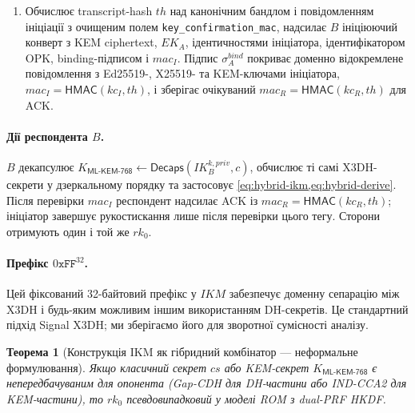 \documentclass[11pt,a4paper]{article}
\newtheorem{theorem}{Теорема}[section]
\theoremstyle{definition}
\newcommand{\HKDF}{\textsf{HKDF}}
\newcommand{\HMAC}{\textsf{HMAC}}
\newcommand{\KEM}{\textsf{ML-KEM-768}}
\newcommand{\Decaps}{\textsf{Decaps}}
\newcommand{\GapCDH}{\textsf{Gap-CDH}}
\newcommand{\INDCCA}{\textsf{IND-CCA2}}
\newcommand{\dualPRF}{\textsf{dual-PRF}}
\newcommand{\rk}{\ensuremath{\mathit{rk}}}
\newcommand{\mdk}{\ensuremath{\mathit{mdk}}}
\newcommand{\IK}{\ensuremath{\mathit{IK}}}
\newcommand{\EK}{\ensuremath{\mathit{EK}}}
\begin{document}
\begin{enumerate}
\begin{align}
      \mdk_0 &\gets \HKDF(\rk_0,\,32,\,\mathit{ctx}_{md},\,
        \texttt{Aura-MetadataKey}),\\
      \mathit{kc}_I &\gets \HKDF(\rk_0,\,32,\,\varepsilon,\,
        \texttt{Aura-KeyConfirm-I}),\\
      \mathit{kc}_R &\gets \HKDF(\rk_0,\,32,\,\varepsilon,\,
        \texttt{Aura-KeyConfirm-R}).
    \end{align}
  \item Обчислює transcript-hash $\mathit{th}$ над канонічним бандлом і
    повідомленням ініціації з очищеним полем \texttt{key\_confirmation\_mac},
    надсилає $B$ ініціюючий конверт з KEM ciphertext, $\EK_A$,
    ідентичностями ініціатора, ідентифікатором OPK, binding-підписом
    і $\mathit{mac}_I$. Підпис $\sigma_A^{\mathit{bind}}$ покриває
    доменно відокремлене повідомлення з Ed25519-, X25519- та KEM-ключами
    ініціатора,
    $\mathit{mac}_I=\HMAC(\mathit{kc}_I,\mathit{th})$, і зберігає
    очікуваний $\mathit{mac}_R=\HMAC(\mathit{kc}_R,\mathit{th})$ для ACK.
\end{enumerate}

\paragraph{Дії респондента $B$.}
$B$ декапсулює $K_{\KEM} \gets \Decaps(\IK_B^{k,\mathit{priv}}, c)$,
обчислює ті самі X3DH-секрети у дзеркальному порядку та
застосовує \cref{eq:hybrid-ikm,eq:hybrid-derive}. Після перевірки
$\mathit{mac}_I$ респондент надсилає ACK із
$\mathit{mac}_R=\HMAC(\mathit{kc}_R,\mathit{th})$; ініціатор завершує
рукостискання лише після перевірки цього тегу. Сторони отримують один
і той же $\rk_0$.

\paragraph{Префікс $0\mathtt{xFF}^{32}$.}
Цей фіксований 32-байтовий префікс у $\mathit{IKM}$ забезпечує
доменну сепарацію між X3DH і будь-яким можливим іншим використанням
DH-секретів. Це стандартний підхід Signal X3DH; ми зберігаємо його
для зворотної сумісності аналізу.

\begin{theorem}[Конструкція IKM як гібридний комбінатор —
неформальне формулювання]
\label{thm:hybrid-ikm-informal}
Якщо класичний секрет $\mathit{cs}$ або KEM-секрет $K_{\KEM}$ є
непередбачуваним для опонента (\GapCDH{} для DH-частини або \INDCCA{} для
KEM-частини), то $\rk_0$
псевдовипадковий у моделі ROM з \dualPRF{} HKDF.
\end{theorem}
\end{document}
